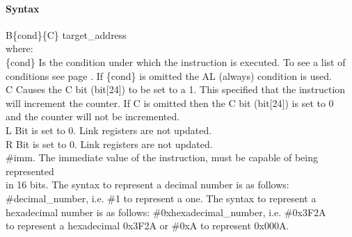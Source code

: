 \documentclass[12pt]{article}
\begin{document}
    \paragraph{Syntax}
    \begin{flushleft}
    B\{cond\}\{C\} target\_address\\
    \vspace{1em}        %
    where:\\
    \vspace{1em}
    \{cond\}    \hspace{2em} Is the condition under which the instruction is executed. To see a list of\\
                \hspace{5.4em} conditions see page . If \{cond\} is omitted the AL (always) condition is used.\\
    \vspace{1em}
    C       \hspace{4.5em} Causes the C bit (bit[24]) to be set to a 1. This specified that the instruction\\
            \hspace{5.4em} will increment the counter. If C is omitted then the C bit (bit[24]) is set to 0\\
            \hspace{5.4em} and the counter will not be incremented.\\
    \vspace{1em}
    L       \hspace{4.5em} Bit is set to 0. Link registers are not updated.\\
    \vspace{1em}
    R       \hspace{4.5em} Bit is set to 0. Link registers are not updated.\\
    \vspace{1em}
    \#imm.  \hspace{1.8em} The immediate value of the instruction, must be capable of being represented\\              \hspace{5.4em} in 16 bits. The syntax to represent a decimal number is as follows:\\
            \hspace{5.4em} \#decimal\_number, i.e. \#1 to represent a one. The syntax to represent a\\
            \hspace{5.4em} hexadecimal number is as follows: \#0xhexadecimal\_number, i.e. \#0x3F2A \\
            \hspace{5.4em} to represent a hexadecimal 0x3F2A or \#0xA to represent 0x000A.\\
    \end{flushleft}
    
\end{document}
